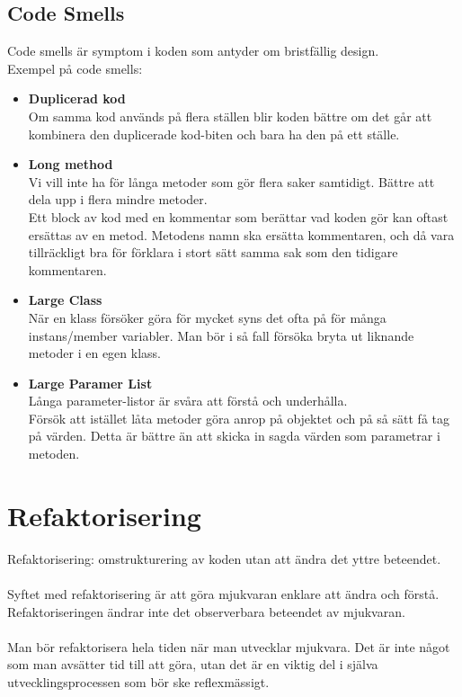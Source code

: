 \documentclass[a4paper]{article}
\begin{document}
\subsection{Code Smells}
Code smells är symptom i koden som antyder om bristfällig design. \\
Exempel på code smells:
\begin{itemize}
\item[]{\textbf{Duplicerad kod} \\
	Om samma kod används på flera ställen blir koden bättre om det går att kombinera den duplicerade kod-biten och bara ha den på ett ställe.}
\item[]{\textbf{Long method} \\
	Vi vill inte ha för långa metoder som gör flera saker samtidigt. Bättre att dela upp i flera mindre metoder. \\ 
	Ett block av kod med en kommentar som berättar vad koden gör kan oftast ersättas av en metod. Metodens namn ska ersätta kommentaren, och då vara tillräckligt bra för förklara i stort sätt samma sak som den tidigare kommentaren.} 
\item[]{\textbf{Large Class} \\
	När en klass försöker göra för mycket syns det ofta på för många instans/member variabler. Man bör i så fall försöka bryta ut liknande metoder i en egen klass.}
\item[]{\textbf{Large Paramer List} \\
	Långa parameter-listor är svåra att förstå och underhålla. \\
	Försök att istället låta metoder göra anrop på objektet och på så sätt få tag på värden. Detta är bättre än att skicka in sagda värden som parametrar i metoden.}
\end{itemize}
\section{Refaktorisering} %

Refaktorisering: omstrukturering av koden utan att ändra det yttre beteendet. \\ \\
Syftet med refaktorisering är att göra mjukvaran enklare att ändra och förstå. Refaktoriseringen ändrar inte det observerbara beteendet av mjukvaran. \\ \\
Man bör refaktorisera hela tiden när man utvecklar mjukvara. Det är inte något som man avsätter tid till att göra, utan det är en viktig del i själva utvecklingsprocessen som bör ske reflexmässigt.
\end{document}
